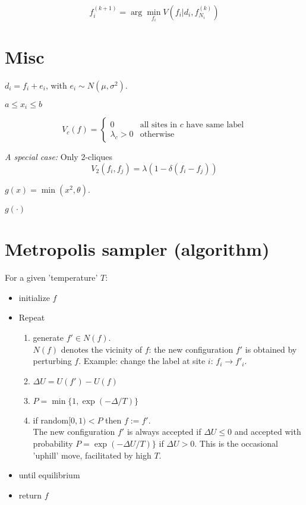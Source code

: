 \documentclass{article}
\begin{document}
$$
f_i^{(k+1)}=\arg \min_{f_i} V(f_i | d_i, f_{N_i}^{(k)})
$$

\section{Misc}

$d_i = f_i + e_i$, with $e_i \sim N(\mu, \sigma^2)$.

$a \leq x_i \leq b$

$$
V_c(f)=
\begin{cases}
0 & \text{all sites in $c$ have same label}\\
\lambda_c > 0 & \text{otherwise}
\end{cases}
$$

\textit{A special case:}
Only 2-cliques
$$V_2(f_i, f_j) = \lambda (1-\delta(f_i-f_j))$$

$g(x) = \min(x^2, \theta)$.

$g(\cdot)$ 

\section{Metropolis sampler (algorithm)}
For a given 'temperature' $T$:

\begin{itemize}
\item initialize $f$
\item Repeat
  \begin{enumerate}
    \item generate $f' \in N(f)$.\\ $N(f)$ denotes the vicinity of $f$:
      the new configuration $f'$ is obtained by perturbing $f$. Example:
      change the label at site $i$: $f_i \rightarrow f'_i$.
    \item $\Delta U = U(f')-U(f)$
    \item $P=\min\{1,\exp(-\Delta/T)\}$
    \item if random$[0,1) < P$ then $f:=f'$.\\
      The new configuration $f'$ is always accepted if $\Delta U \leq
      0$ and accepted with probability $P=\exp(-\Delta U / T)\}$ if
      $\Delta U > 0$. This is the occasional 'uphill' move,
      facilitated by high $T$.
  \end{enumerate}
  \item until equilibrium
  \item return $f$
\end{itemize}

\end{document}
